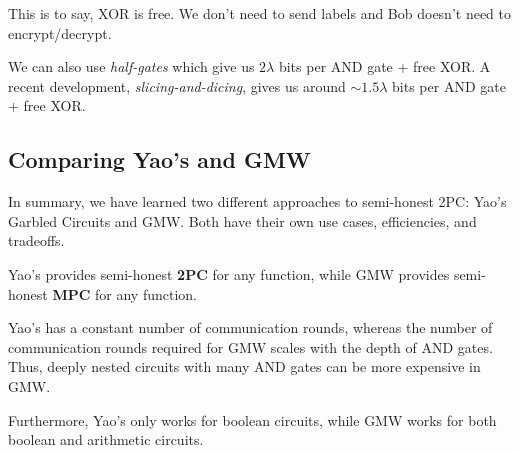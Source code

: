 This is to say, \textsf{XOR} is free. We don't need to send labels and Bob doesn't need to encrypt/decrypt.


We can also use \emph{half-gates} which give us $2\lambda$ bits per \textsf{AND} gate + free \textsf{XOR}. A recent development, \emph{slicing-and-dicing}, gives us around $\sim 1.5\lambda$ bits per \textsf{AND} gate + free \textsf{XOR}.

\subsection{Comparing Yao's and GMW}
In summary, we have learned two different approaches to semi-honest 2PC: Yao's Garbled Circuits and GMW. Both have their own use cases, efficiencies, and tradeoffs.

Yao's provides semi-honest \textbf{2PC} for any function, while GMW provides semi-honest \textbf{MPC} for any function.

Yao's has a constant number of communication rounds, whereas the number of communication rounds required for GMW scales with the depth of AND gates. Thus, deeply nested circuits with many AND gates can be more expensive in GMW.

Furthermore, Yao's only works for boolean circuits, while GMW works for both boolean and arithmetic circuits.